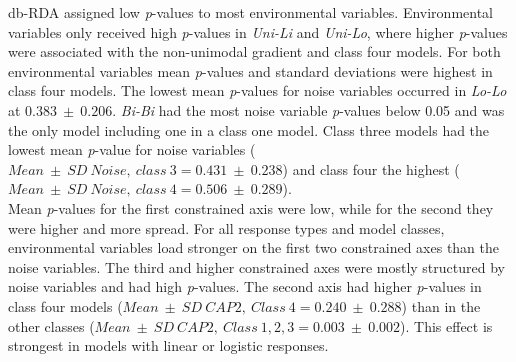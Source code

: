 		db-RDA assigned low \textit{p}-values to most environmental variables.
		Environmental variables only received high \textit{p}-values in \textit{Uni-Li} and \textit{Uni-Lo}, where higher \textit{p}-values were associated with the non-unimodal gradient and class four models.
		For both environmental variables mean \textit{p}-values and standard deviations were highest in class four models. 
		The lowest mean \textit{p}-values for noise variables occurred in \textit{Lo-Lo} at $0.383\ \pm\ 0.206$. 
		\textit{Bi-Bi} had the most noise variable \textit{p}-values below 0.05 and was the only model including one in a class one model. 
		Class three models had the lowest mean \textit{p}-value for noise variables ($Mean\ \pm\ SD\ \scriptscriptstyle Noise,\ class\ 3 \textstyle = 0.431\ \pm\ 0.238$) and class four the highest ($Mean\ \pm\ SD\ \scriptscriptstyle Noise,\ class\ 4  \textstyle = 0.506\ \pm\ 0.289$).\\
		Mean \textit{p}-values for the first constrained axis were low, while for the second they were higher and more spread. 
		For all response types and model classes, environmental variables load stronger on the first two constrained axes than the noise variables.
		The third and higher constrained axes were mostly structured by noise variables and had high \textit{p}-values. 
		The second axis had higher \textit{p}-values in class four models ($Mean\ \pm\ SD\ \scriptscriptstyle CAP2,\ Class\ 4 \textstyle = 0.240\ \pm\ 0.288$)
		than in the other classes ($Mean\ \pm\ SD\ \scriptscriptstyle CAP2,\ Class\ 1,2,3 \textstyle = 0.003\ \pm\ 0.002$).
		This effect is strongest in models with linear or logistic responses.

		
	
